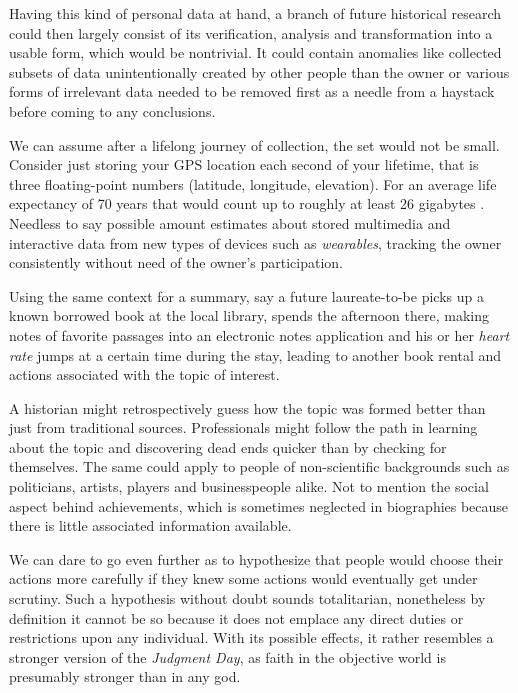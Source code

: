 \documentclass[a4paper]{article}
\begin{document}
Having this kind of personal data at hand, a branch of future historical research could then largely consist of its verification, analysis and transformation into a usable form, which would be nontrivial.
It could contain anomalies like collected subsets of data unintentionally created by other people than the owner or various forms of irrelevant data needed to be removed first as a needle from a haystack before coming to any conclusions.

We can assume after a lifelong journey of collection, the set would not be small. Consider just storing your GPS location each second of your  lifetime, that is three floating-point numbers (latitude, longitude, elevation).
For an average life expectancy of 70 years that would count up to roughly at least 26 gigabytes \cite{calc}. Needless to say possible amount estimates about stored multimedia and interactive data from new types of devices such as \emph{wearables}, tracking the owner consistently without need of the owner's participation.

Using the same context for a summary, say a future laureate-to-be picks up a known borrowed book at the local library, spends the afternoon there, making notes of favorite passages into an electronic notes application and his or her \emph{heart rate} jumps at a certain time during the stay, leading to another book rental and actions associated with the topic of interest.

A historian might retrospectively guess how the topic was formed better than just from traditional sources. Professionals might follow the path in learning about the topic and discovering dead ends quicker than by checking for themselves.
The same could apply to people of non-scientific backgrounds such as politicians, artists, players and businesspeople alike. Not to mention the social aspect behind achievements, which is sometimes neglected in biographies because there is little associated information available.

We can dare to go even further as to hypothesize that people would choose their actions more carefully if they knew some actions would eventually get under scrutiny. Such a hypothesis without doubt sounds totalitarian, nonetheless by definition it cannot be so because it does not emplace any direct duties or restrictions upon any individual. With its possible effects, it rather resembles a stronger version of the \textit{Judgment Day}, as faith in the objective world is presumably stronger than in any god.
\end{document}
